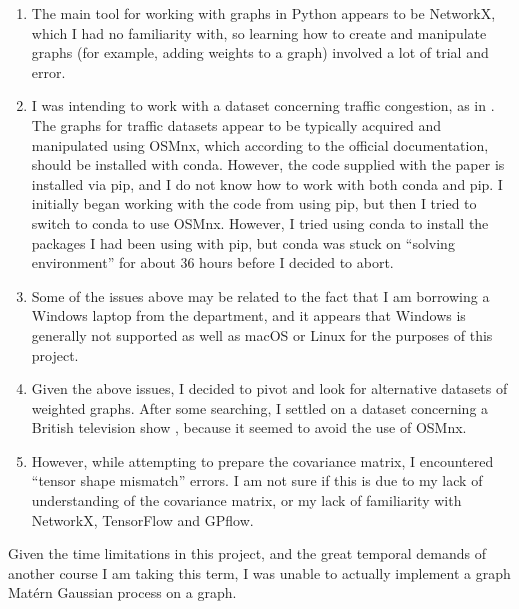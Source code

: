 \begin{enumerate}
    \item The main tool for working with graphs in Python appears to be NetworkX, which I had no familiarity with, so learning how to create and manipulate graphs (for example, adding weights to a graph) involved a lot of trial and error.
    \item I was intending to work with a dataset concerning traffic congestion, as in \cite{pmlr-v130-borovitskiy21a}. The graphs for traffic datasets appear to be typically acquired and manipulated using OSMnx, which according to the official documentation, should be installed with conda. However, the code supplied with the paper \cite{pmlr-v130-borovitskiy21a} is installed via pip, and I do not know how to work with both conda and pip. I initially began working with the code from \cite{pmlr-v130-borovitskiy21a} using pip, but then I tried to switch to conda to use OSMnx. However, I tried using conda to install the packages I had been using with pip, but conda was stuck on ``solving environment'' for about 36 hours before I decided to abort.
    \item Some of the issues above may be related to the fact that I am borrowing a Windows laptop from the department, and it appears that Windows is generally not supported as well as macOS or Linux for the purposes of this project.
    \item Given the above issues, I decided to pivot and look for alternative datasets of weighted graphs. After some searching, I settled on a dataset concerning a British television show \cite{docwho}, because it seemed to avoid the use of OSMnx.
    \item However, while attempting to prepare the covariance matrix, I encountered ``tensor shape mismatch'' errors. I am not sure if this is due to my lack of understanding of the covariance matrix, or my lack of familiarity with NetworkX, TensorFlow and GPflow.
\end{enumerate}

Given the time limitations in this project, and the great temporal demands of another course I am taking this term, I was unable to actually implement a graph Mat\'{e}rn Gaussian process on a graph.

